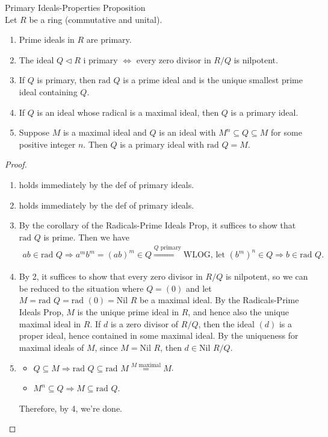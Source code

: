 \begin{proposition}{Primary Ideals-Properties Proposition}\\
Let $R$ be a ring (commutative and unital).
\begin{enumerate}
    \item Prime ideals in $R$ are primary.
    \item The ideal $Q \triangleleft R$ i primary $\Leftrightarrow$ every zero divisor in $R/Q$ is nilpotent.
    \item If $Q$ is primary, then $\text{rad }Q$ is a prime ideal and is the unique smallest prime ideal containing $Q$.
    \item If $Q$ is an ideal whose radical is a maximal ideal, then $Q$ is a primary ideal.
    \item Suppose $M$ is a maximal ideal and $Q$ is an ideal with $M^n \subseteq Q \subseteq M$ for some positive integer $n$. Then $Q$ is a primary ideal with $\text{rad }Q=M$.
\end{enumerate}
\end{proposition}

\begin{proof}
    \begin{enumerate}
        \item holds immediately by the def of primary ideals.
        \item holds immediately by the def of primary ideals.

        \item By the corollary of the Radicals-Prime Ideals Prop, it suffices to show that $\text{rad }Q$ is prime. Then we have
        \begin{align*}
            ab \in \text{rad }Q \Rightarrow a^mb^m =(ab)^m \in Q \overset{Q \text{ primary}}{\Rightarrow} \text{WLOG, let } (b^m)^n \in Q \Rightarrow b\in \text{rad }Q.
        \end{align*}

        \item By 2, it suffices to show that every zero divisor in $R/Q$ is nilpotent, so we can be reduced to the situation where $Q=(0)$ and let $M= \text{rad }Q = \text{rad } (0)= \text{Nil }R$ be a maximal ideal. By the Radicals-Prime Ideals Prop, $M$ is the unique prime ideal in $R$, and hence also the unique maximal ideal in $R$. If $d$ is a zero divisor of $R/Q$, then the ideal $(d)$ is a proper ideal, hence contained in some maximal ideal. By the uniqueness for maximal ideals of $M$, since $M= \text{Nil }R$, then $d\in \text{Nil }R/Q$.

        \item \begin{itemize}
            \item $Q \subseteq M \Rightarrow \text{rad }Q \subseteq \text{rad }M \overset{M \text{ maximal}}{=}M$.
            \item $M^n \subseteq Q \Rightarrow M \subseteq \text{rad }Q$.
        \end{itemize}
        Therefore, by 4, we're done.
    \end{enumerate}
\end{proof}

